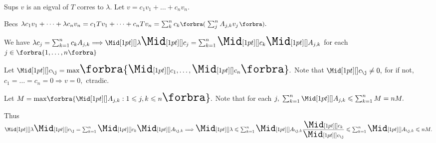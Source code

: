 \par\quad
Sups $v$ is an eigval of $T$ corres to $\lambda.$ Let $v=c_1v_1+\dots+c_nv_n.$\vspace{2pt}\par\quad
Becs $\lambda c_1v_1+\dots+\lambda c_nv_n=c_1Tv_1+\dots+c_nTv_n=\sum_{k}^nc_k\BigPar{\sum_{j}^n A_{j,k}v_j}.$\vspace{3pt}\par\quad
We have $\lambda c_j=\sum_{k=1}^n c_kA_{j,k}\Longrightarrow\aMid{\lambda}\aMid{c_j}=\sum_{k=1}^n\aMid{c_k}\aMid{A_{j,k}}$ for each $j\in\Bra{1,\dots,n}$\vspace{4pt}\par\quad
Let $\aMid{c_{\j}}=\max\!\Bra{\aMid{c_1},\dots,\aMid{c_n}}.$ Note that $\aMid{c_{\j}}\neq 0,$ for if not, $c_1=\dots=c_n=0\Rightarrow v=0,$ ctradic.\vspace{6pt}\par\quad
Let $M=\max\!\Bra{\aMid{A_{j,k}}:1\leqslant j,k\leqslant n}.$ Note that for each $j,\;\sum_{k=1}^n\aMid{A_{j,k}}\leqslant\sum_{k=1}^nM=nM.$\vspace{4pt}\par\quad
Thus $\aMid{\lambda}\aMid{c_{\j}}=\sum_{k=1}^n\aMid{c_k}\aMid{A_{{\j},k}}\Longrightarrow\aMid{\lambda}\leqslant\sum_{k=1}^n\aMid{A_{{\j},k}}\Frac{\aMid{c_k}}{\aMid{c_{\j}}}\leqslant\sum_{k=1}^n\aMid{A_{{\j},k}}\leqslant nM.$\PfEnd\vspace{2pt}
\SepLine\pagebreak

